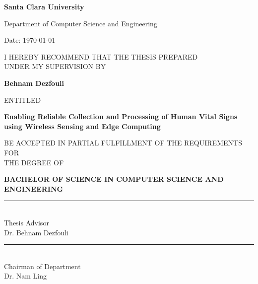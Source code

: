 
\thispagestyle{empty}%


\newcommand{\thesisTitle}{Enabling Reliable Collection and Processing of Human Vital Signs using Wireless Sensing and Edge Computing}


\begin{center}
{\bf\LARGE Santa Clara University}

\par Department of Computer Science and Engineering

\par\vspace{3mm}\hfill Date: \today

\par\vspace{10mm}
I HEREBY RECOMMEND THAT THE THESIS PREPARED\\ 
UNDER MY SUPERVISION BY

\par\vspace{2mm}
{\bf Behnam Dezfouli}

\par\vspace{5mm}
ENTITLED

{\bf\large \thesisTitle}

\par\vspace{5mm}
BE ACCEPTED IN PARTIAL FULFILLMENT OF THE REQUIREMENTS FOR\\ THE DEGREE OF

\par\vspace{5mm}
{\bf BACHELOR OF SCIENCE IN COMPUTER SCIENCE AND ENGINEERING}
\end{center}

\vfill

\parbox[t]{50mm}{
\rule{50mm}{0.5pt}\\Thesis Advisor \\ Dr. Behnam Dezfouli

\par\vspace{10mm}
\rule{50mm}{0.5pt}\\Chairman of Department\\Dr. Nam Ling



}



